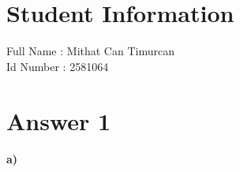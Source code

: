 \documentclass[12pt]{article}
\begin{document}
\section*{Student Information } 
Full Name : Mithat Can Timurcan\\
Id Number :  2581064\\

\section*{Answer 1}
\paragraph*{a)}
\end{document}

